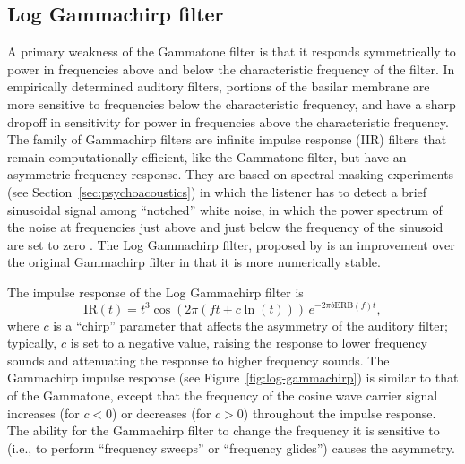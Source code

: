 \subsection{Log Gammachirp filter}

A primary weakness of the Gammatone filter
is that it responds symmetrically
to power in frequencies above and below
the characteristic frequency of the filter.
In empirically determined auditory filters,
portions of the basilar membrane
are more sensitive to frequencies
below the characteristic frequency,
and have a sharp dropoff in sensitivity
for power in frequencies
above the characteristic frequency.
The family of Gammachirp filters
are infinite impulse response (IIR) filters
that remain computationally efficient,
like the Gammatone filter,
but have an asymmetric frequency response.
They are based on spectral masking experiments
(see Section~\ref{sec:psychoacoustics})
in which the listener has to
detect a brief sinusoidal signal
among ``notched'' white noise,
in which the power spectrum of the noise
at frequencies just above and just below
the frequency of the sinusoid
are set to zero \citep{patterson1976}.
The Log Gammachirp filter,
proposed by \citet{unoki2001}
is an improvement over
the original Gammachirp filter
\citep{irino1997}
in that it is more numerically stable.

The impulse response
of the Log Gammachirp filter is
\begin{equation}
  \text{IR}(t) = t^3 \cos(2 \pi (f t + c \ln(t))) \, e^{-2 \pi b \text{ERB}(f) t},
\end{equation}
where $c$ is a ``chirp'' parameter
that affects the asymmetry
of the auditory filter;
typically, $c$ is set to a negative value,
raising the response to lower frequency sounds
and attenuating the response to higher frequency sounds.
The Gammachirp impulse response
(see Figure~\ref{fig:log-gammachirp})
is similar to that of the Gammatone,
except that the frequency of the cosine wave
carrier signal increases (for $c < 0$)
or decreases (for $c > 0$)
throughout the impulse response.
The ability for the Gammachirp filter to
change the frequency it is sensitive to
(i.e., to perform ``frequency sweeps''
or ``frequency glides'')
causes the asymmetry.


